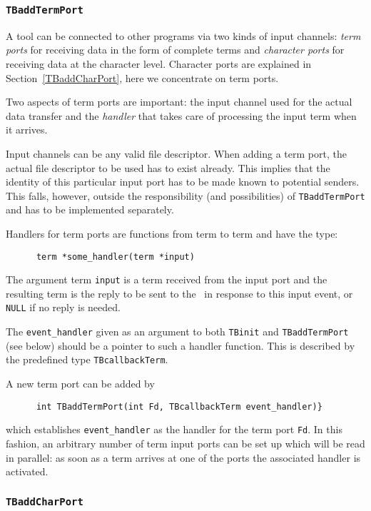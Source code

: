 \subsubsection{\label{TBaddTermPort}{\tt TBaddTermPort}}

A tool can be connected to other programs via two kinds of input channels:
{\em term ports} for receiving data in the form of complete
terms  and {\em character ports} for receiving data at the character level.
Character ports are explained in Section~\ref{TBaddCharPort}, here we concentrate on
term ports.

Two aspects of term ports are important: the input channel used for
the actual data transfer and the {\em handler} that takes care of processing
the input term when it arrives.

Input channels can be any valid file descriptor.  When adding a term
port, the actual file descriptor to be used has to exist already.
This implies that the identity of this particular input port has to be
made known to potential senders. This falls, however,
outside the responsibility (and possibilities) of {\tt TBaddTermPort}
and has to be implemented separately.

Handlers for term ports are functions from term to term and have the
type:
\begin{verbatim}
      term *some_handler(term *input)
\end{verbatim}
The argument term {\tt input} is a term received from the input port
and the resulting term is the reply to be sent  to the \TB\ in response
to this input event, or {\tt NULL} if no reply is needed.

The {\tt event\_handler} given as an argument to both {\tt TBinit} and
{\tt TBaddTermPort} (see below) should be a pointer to such a handler function.
This is described by the predefined type {\tt TBcallbackTerm}.

A new term port can be added by
\begin{verbatim}
      int TBaddTermPort(int Fd, TBcallbackTerm event_handler)}
\end{verbatim}
which establishes {\tt event\_handler} as the handler for the term port {\tt Fd}.
In this fashion, an arbitrary number of term input ports can be set up which
will be read in parallel: as soon as a term arrives at one of the ports
the associated handler is activated.

\subsubsection{\label{TBaddCharPort}{\tt TBaddCharPort}}


